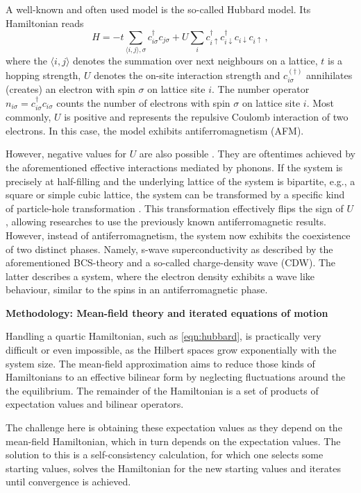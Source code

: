\documentclass{article}
\newcommand{\msection}[1]{ { \vspace{5mm} \hspace{-6mm} \large \textbf{#1}} \vspace{2mm} } %
\begin{document}
A well-known and often used model is the so-called Hubbard model. Its Hamiltonian reads
\begin{equation}
    \label{eqn:hubbard}
    H = -t \sum_{\langle i, j \rangle, \sigma} c_{i\sigma}^\dagger c_{j\sigma} 
    + U \sum_i c_{i\uparrow}^\dagger c_{i\downarrow}^\dagger c_{i\downarrow} c_{i\uparrow}\,,
\end{equation}
where the $\langle i, j \rangle$ denotes the summation over next neighbours on a lattice, $t$ is a hopping strength, 
$U$ denotes the on-site interaction strength and $c_{i\sigma}^{(\dagger)}$ annihilates (creates) an electron with spin $\sigma$ on lattice site $i$.
The number operator $n_{i\sigma} = c_{i\sigma}^\dagger c_{i\sigma}$ counts the number of electrons with spin $\sigma$ on lattice site $i$.
Most commonly, $U$ is positive and represents the repulsive Coulomb interaction of two electrons.
In this case, the model exhibits antiferromagnetism (AFM).

However, negative values for $U$ are also possible \cite{althueser2024,sentef}. They are oftentimes achieved by the aforementioned effective interactions mediated by phonons.
If the system is precisely at half-filling and the underlying lattice of the system is bipartite, e.g., a square or simple cubic lattice, 
the system can be transformed by a specific kind of particle-hole transformation \cite{micnas90}.
This transformation effectively flips the sign of $U$, allowing researches to use the previously known antiferromagnetic results.
However, instead of antiferromagnetism, the system now exhibits the coexistence of two distinct phases.
Namely, s-wave superconductivity as described by the aforementioned BCS-theory and a so-called charge-density wave (CDW).
The latter describes a system, where the electron density exhibits a wave like behaviour, similar to the spins in an antiferromagnetic phase.
\newpage

\msection{Methodology: Mean-field theory and iterated equations of motion}

Handling a quartic Hamiltonian, such as \eqref{eqn:hubbard}, is practically very difficult or even impossible,
as the Hilbert spaces grow exponentially with the system size.
The mean-field approximation aims to reduce those kinds of Hamiltonians to an effective bilinear form by neglecting fluctuations around the the equilibrium.
The remainder of the Hamiltonian is a set of products of expectation values and bilinear operators.

The challenge here is obtaining these expectation values as they depend on the mean-field Hamiltonian, which in turn depends on the expectation values.
The solution to this is a self-consistency calculation, for which one selects some starting values,
solves the Hamiltonian for the new starting values and iterates until convergence is achieved.
\end{document}
